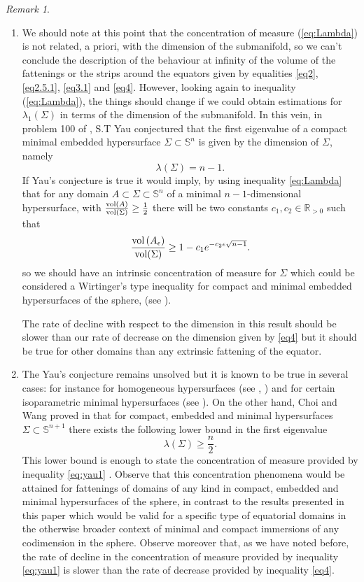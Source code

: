 \documentclass{amsart}
\theoremstyle{definition}
\theoremstyle{remark}
\newtheorem{remark}[theorem]{Remark}
\begin{document}
\begin{remark}
\begin{enumerate}
\item We should note at this point that the concentration of measure (\ref{eq:Lambda}) is not related, a priori, with the dimension of the submanifold, so we can't conclude the description of the behaviour at infinity of the volume of the fattenings or the strips around the equators given by equalities \eqref{eq2}, \eqref{eq2.5.1}, \eqref{eq3.1} and \eqref{eq4}. However, looking again to inequality (\ref{eq:Lambda}), the things should change if we could obtain estimations for $\lambda_1(\Sigma)$ in terms of the dimension of the submanifold. In this vein, in problem 100 of \cite{YauMR0645728}, S.T Yau conjectured that the first eigenvalue of a compact minimal embedded hypersurface $\Sigma\subset \mathbb{S}^{n}$ is given by the dimension of $\Sigma$, namely
$$\lambda(\Sigma)=n-1.$$
If  Yau's conjecture is true it would  imply, by using inequality \eqref{eq:Lambda} that for any domain $A\subset \Sigma\subset \mathbb{S}^{n}$  of a minimal $n-1$-dimensional hypersurface, with 
 $\frac{{\rm vol}(A)}{{\rm vol}( \Sigma)}\geq \frac{1}{2}$ there will be two constants $c_1,c_2\in \mathbb{R}_{>0}$ such that
 \begin{equation}\label{eq:yau1}
   \frac{{\rm vol}\left(A_\epsilon\right)}{{\rm vol}( \Sigma)}\geq 1-c_1e^{-c_2\epsilon\sqrt{n-1}}. 
\end{equation}
\noindent so we should have an intrinsic concentration of measure for $\Sigma$ which could be considered a Wirtinger's type inequality for compact and minimal embedded hypersurfaces of the sphere, (see \cite{Gromov}).

The rate of decline with respect to the dimension in this result  should be slower than our rate of decrease on the dimension given by \eqref{eq4} but it should be true for other domains than any extrinsic fattening of the equator.
\medskip

\item The Yau's conjecture remains unsolved but it is known to be true in several  cases: for instance for homogeneous hypersurfaces (see \cite{MR0742598}, \cite{MR0814078}) and for certain isoparametric minimal hypersurfaces (see \cite{MR3080491}).   On the other hand, Choi and Wang proved in \cite{Choi1983559} that for compact, embedded  and minimal hypersurfaces $\Sigma\subset\mathbb{S}^{n+1}$ there exists the following lower bound in the first eigenvalue
$$\lambda(\Sigma)\geq \frac{n}{2}.$$
This lower bound is enough to state the concentration of measure provided by inequality \eqref{eq:yau1} . Observe  that this concentration phenomena would be attained for fattenings of domains of any kind in compact, embedded and minimal hypersurfaces of the sphere, in contrast to the results presented in this paper which would be valid for a specific type of equatorial domains in the otherwise broader context of minimal and compact immersions of any codimension in the sphere. Observe moreover that, as we have noted before, the  rate of decline in the concentration of measure provided by inequality \eqref{eq:yau1}  is slower than the rate of decrease provided  by  inequality \eqref{eq4}.




\end{enumerate}
\end{remark}
\end{document}
